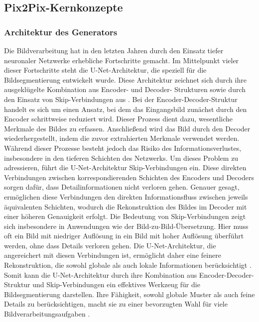 \subsection{Pix2Pix-Kernkonzepte}
\subsubsection{Architektur des Generators}
Die Bildverarbeitung hat in den letzten Jahren durch den Einsatz tiefer neuronaler Netzwerke erhebliche Fortschritte gemacht. Im Mittelpunkt vieler dieser Fortschritte steht die U-Net-Architektur, die speziell für die Bildsegmentierung entwickelt wurde. Diese Architektur zeichnet sich durch ihre ausgeklügelte Kombination aus Encoder- und Decoder- Strukturen sowie durch den Einsatz von Skip-Verbindungen aus \cite{PhillipIsola.}. 
 \newline
Bei der Encoder-Decoder-Struktur handelt es sich um einen Ansatz, bei dem das Eingangsbild zunächst durch den Encoder schrittweise reduziert wird. Dieser Prozess dient dazu, wesentliche Merkmale des Bildes zu erfassen. Anschließend wird das Bild durch den Decoder wiederhergestellt, indem die zuvor extrahierten Merkmale verwendet werden. Während dieser Prozesse besteht jedoch das Risiko des Informationsverlustes, insbesondere in den tieferen Schichten des Netzwerks.
Um dieses Problem zu adressieren, führt die U-Net-Architektur Skip-Verbindungen ein. Diese direkten Verbindungen zwischen korrespondierenden Schichten des Encoders und Decoders sorgen dafür, dass Detailinformationen nicht verloren gehen. Genauer gesagt, ermöglichen diese Verbindungen den direkten Informationsfluss zwischen jeweils äquivalenten Schichten, wodurch die Rekonstruktion des Bildes im Decoder mit einer höheren Genauigkeit erfolgt\cite{PhillipIsola.}. \newline
Die Bedeutung von Skip-Verbindungen zeigt sich insbesondere in Anwendungen wie der Bild-zu-Bild-Übersetzung. Hier muss oft ein Bild mit niedriger Auflösung in ein Bild mit hoher Auflösung überführt werden, ohne dass Details verloren gehen. Die U-Net-Architektur, die angereichert mit diesen Verbindungen ist, ermöglicht daher eine feinere Rekonstruktion, die sowohl globale als auch lokale Informationen berücksichtigt \cite{PhillipIsola.}.  \newline
Somit kann die U-Net-Architektur durch ihre Kombination aus Encoder-Decoder-Struktur und Skip-Verbindungen ein effektives Werkzeug für die Bildsegmentierung darstellen. Ihre Fähigkeit, sowohl globale Muster als auch feine Details zu berücksichtigen, macht sie zu einer bevorzugten Wahl für viele Bildverarbeitungsaufgaben \cite{PhillipIsola.}. \newline
